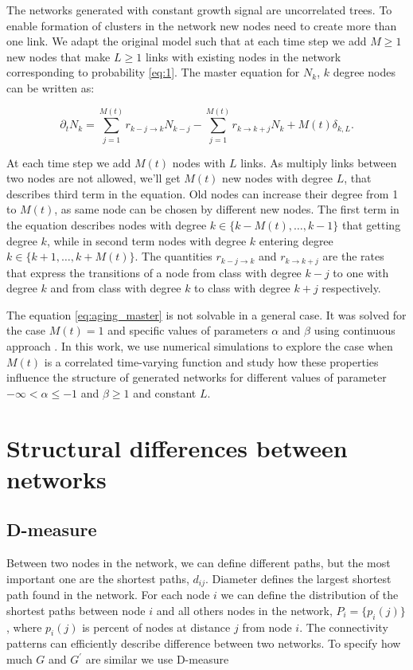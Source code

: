 The networks generated with constant growth signal are uncorrelated trees. To enable formation of clusters in the network new nodes need to create more than one link. We adapt the original model such that at each time step we add $M\geq1$ new nodes that make $L\geq1$ links with existing nodes in the network corresponding to probability \ref{eq:1}. 
The master equation for $N_k$, $k$ degree nodes can be written as:

\begin{equation}
\partial_{t}N_{k}=\sum^{M(t)}_{j=1}r_{k-j\longrightarrow k}N_{k-j}-\sum^{M(t)}_{j=1}r_{k\longrightarrow k+j}N_{k}+M(t)\delta_{k,L} . \label{eq:aging_master}  
\end{equation}

At each time step we add $M(t)$ nodes with $L$ links. As multiply links between two nodes are not allowed, we'll get $M(t)$ new nodes with degree $L$, that describes third term in the equation. Old nodes can increase their degree from 1 to $M(t)$, as same node can be chosen by different new nodes. The first term in the equation describes nodes with degree $k\in\{k-M(t),\ldots, k-1\}$ that getting degree $k$, while in second term nodes with degree $k$ entering degree  $k\in\{k+1,\ldots, k+M(t)\}$. The quantities $r_{k-j\longrightarrow k}$ and $r_{k\longrightarrow k+j}$ are the rates that express the transitions of a node from class with degree $k-j$ to one with degree $k$ and from class with degree $k$ to class with degree $k+j$ respectively. 

The equation \ref{eq:aging_master} is not solvable in a general case. It was solved for the case $M(t)=1$ and specific values of parameters $\alpha$ and $\beta$ using continuous approach \cite{dorogovtsev2001b}. In this work, we use numerical simulations to explore the case when $M(t)$ is a correlated time-varying function and study how these properties influence the structure of generated networks for different values of parameter $-\infty<\alpha\leq-1$ and $\beta\geq1$ and constant $L$.


\section{Structural differences between networks }

\subsection{D-measure}

Between two nodes in the network, we can define different paths, but the most important one are the shortest paths, $d_{ij}$. Diameter defines the largest shortest path found in the network. For each node $i$ we can define the distribution of the shortest paths between node $i$ and all others nodes in the network, $P_{i}=\{p_{i}(j)\}$, where $p_{i}(j)$ is percent of nodes at distance $j$ from node $i$. The connectivity patterns can efficiently describe difference between two networks.    
To specify how much $G$ and $G^{'}$ are similar we use D-measure \cite{tiago2}

